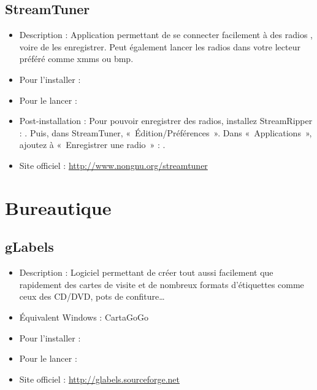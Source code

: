 \subsection{StreamTuner}
\begin{itemize}
\begingroup
{}
\item Description : Application permettant de se connecter facilement à des radios , voire de les enregistrer. Peut également lancer les radios dans votre lecteur préféré comme xmms ou bmp.{\par}
\item Pour l'installer : 
\item Pour le lancer : 
\endgroup
\item Post-installation : Pour pouvoir enregistrer des radios, installez StreamRipper : . Puis, dans StreamTuner, «~Édition/Préférences~». Dans «~Applications~», ajoutez à «~Enregistrer une radio~» : .{\par}
\item Site officiel : \url{http://www.nongnu.org/streamtuner}{\par}
\end{itemize}
\section{Bureautique}
\subsection{gLabels}
\begin{itemize}
\begingroup
{}
\item Description : Logiciel permettant de créer tout aussi facilement que rapidement des cartes de visite et de nombreux formats d'étiquettes comme ceux des CD/DVD, pots de confiture\ldots{}{\par}
\item Équivalent Windows : CartaGoGo{\par}
\item Pour l'installer : 
\item Pour le lancer : 
\item Site officiel : \url{http://glabels.sourceforge.net}{\par}
\endgroup
\end{itemize}
